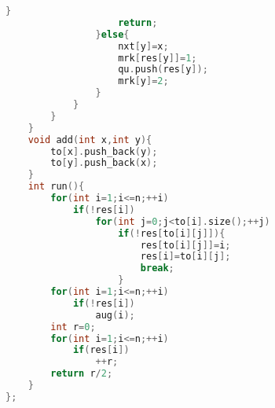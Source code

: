 \documentclass{book}
\begin{document}
\begin{lstlisting}[language=C++,title={Bipartite Graph Maximum Matching.hpp (3121 bytes, 112 lines)}]
                    }
                    return;
                }else{
                    nxt[y]=x;
                    mrk[res[y]]=1;
                    qu.push(res[y]);
                    mrk[y]=2;
                }
            }
        }
    }
    void add(int x,int y){
        to[x].push_back(y);
        to[y].push_back(x);
    }
    int run(){
        for(int i=1;i<=n;++i)
            if(!res[i])
                for(int j=0;j<to[i].size();++j)
                    if(!res[to[i][j]]){
                        res[to[i][j]]=i;
                        res[i]=to[i][j];
                        break;
                    }
        for(int i=1;i<=n;++i)
            if(!res[i])
                aug(i);
        int r=0;
        for(int i=1;i<=n;++i)
            if(res[i])
                ++r;
        return r/2;
    }
};\end{lstlisting}
\end{document}
